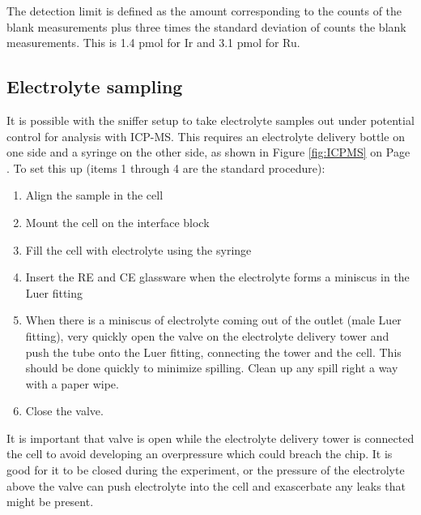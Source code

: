 The detection limit is defined as the amount corresponding to the counts of the blank measurements plus three times the standard deviation of counts the blank measurements\cite{Harris2010}. This is 1.4 pmol for Ir and 3.1 pmol for Ru.


\subsection{Electrolyte sampling}
It is possible with the sniffer setup to take electrolyte samples out under potential control for analysis with ICP-MS. This requires an electrolyte delivery bottle on one side and a syringe on the other side, as shown in Figure \ref{fig:ICPMS} on Page \pageref{fig:ICPMS}. To set this up (items 1 through 4 are the standard procedure):
\begin{enumerate}
	\item Align the sample in the cell
	
	\item Mount the cell on the interface block
	
	\item Fill the cell with electrolyte using the syringe
	
	\item Insert the RE and CE glassware when the electrolyte forms a miniscus in the Luer fitting
	
	\item When there is a miniscus of electrolyte coming out of the outlet (male Luer fitting), very quickly open the valve on the electrolyte delivery tower and push the tube onto the Luer fitting, connecting the tower and the cell. This should be done quickly to minimize spilling. Clean up any spill right a way with a paper wipe.
	
	\item Close the valve.
\end{enumerate}

It is important that valve is open while the electrolyte delivery tower is connected the cell to avoid developing an overpressure which could breach the chip. It is good for it to be closed during the experiment, or the pressure of the electrolyte above the valve can push electrolyte into the cell and exascerbate any leaks that might be present.

